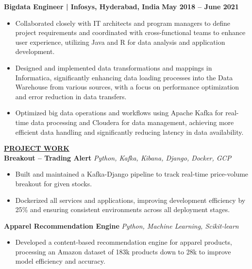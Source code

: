 \documentclass{article}
\begin{document}
\noindent \textbf{Bigdata Engineer | Infosys, Hyderabad, India} \hfill \textbf{May 2018 – June 2021}
\begin{itemize}[noitemsep,nolistsep,leftmargin=*]
\item {\small Collaborated closely with IT architects and program managers to define project requirements and coordinated with cross-functional teams to enhance user experience, utilizing Java and R for data analysis and application development.}
\item {\small Designed and implemented data transformations and mappings in Informatica, significantly enhancing data loading processes into the Data Warehouse from various sources, with a focus on performance optimization and error reduction in data transfers.}
\item {\small Optimized big data operations and workflows using Apache Kafka for real-time data processing and Cloudera for data management, achieving more efficient data handling and significantly reducing latency in data availability.}\\
\end{itemize}



%
%


\noindent \textbf{\underline{PROJECT WORK}} \\
\noindent \textbf{Breakout – Trading Alert} \textit{Python, Kafka, Kibana, Django, Docker, GCP} \hfill \textbf{}
\begin{itemize}[noitemsep,nolistsep,leftmargin=*]
\item {\small Built and maintained a Kafka-Django pipeline to track real-time price-volume breakout for given stocks.}
\item {\small Dockerized all services and applications, improving development efficiency by 25\% and ensuring consistent environments across all deployment stages.}
\end{itemize}

\noindent \textbf{Apparel Recommendation Engine} \textit{Python, Machine Learning, Scikit-learn} \hfill \textbf{}
\begin{itemize}[noitemsep,nolistsep,leftmargin=*]
\item {\small Developed a content-based recommendation engine for apparel products, processing an Amazon dataset of 183k products down to 28k to improve model efficiency and accuracy.}
\end{itemize}
\end{document}
